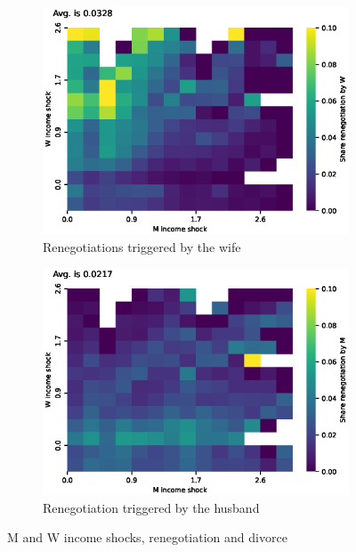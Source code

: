 \documentclass[]{article}
\begin{document}
\begin{figure}[H]
\begin{subfigure}{0.49\textwidth}
		\centering
		\includegraphics[width=\textwidth]{shocks_ren_w.eps} %
		\caption{Renegotiations triggered by the wife}
		\label{fig:picture3}
	\end{subfigure}
	\begin{subfigure}{0.49\textwidth}
		\centering
		\includegraphics[width=\textwidth]{shocks_ren_m.eps} %
		\caption{Renegotiation triggered by the husband}
		\label{fig:picture3}
	\end{subfigure}
	
	\caption{M and W income shocks, renegotiation and divorce}
	\label{fig:surp_ren}
\end{figure}
\end{document}
